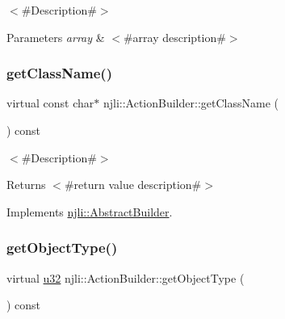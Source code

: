 $<$\#\+Description\#$>$


\begin{DoxyParams}{Parameters}
{\em array} & $<$\#array description\#$>$ \\
\hline
\end{DoxyParams}
\mbox{\label{classnjli_1_1_action_builder_ad94f927c3c793b70caf04ac4170fce18}} 
\subsubsection{\texorpdfstring{get\+Class\+Name()}{getClassName()}}
{\footnotesize\ttfamily virtual const char$\ast$ njli\+::\+Action\+Builder\+::get\+Class\+Name (\begin{DoxyParamCaption}{ }\end{DoxyParamCaption}) const\hspace{0.3cm}{\ttfamily [virtual]}}

$<$\#\+Description\#$>$

\begin{DoxyReturn}{Returns}
$<$\#return value description\#$>$ 
\end{DoxyReturn}


Implements \mbox{\hyperlink{classnjli_1_1_abstract_builder_a902f73ea78031b06aca183a417f3413b}{njli\+::\+Abstract\+Builder}}.

\mbox{\label{classnjli_1_1_action_builder_afe754e36661339a9e9fed27aa8d98580}} 
\subsubsection{\texorpdfstring{get\+Object\+Type()}{getObjectType()}}
{\footnotesize\ttfamily virtual \mbox{\hyperlink{_util_8h_a10e94b422ef0c20dcdec20d31a1f5049}{u32}} njli\+::\+Action\+Builder\+::get\+Object\+Type (\begin{DoxyParamCaption}{ }\end{DoxyParamCaption}) const\hspace{0.3cm}{\ttfamily [virtual]}}

